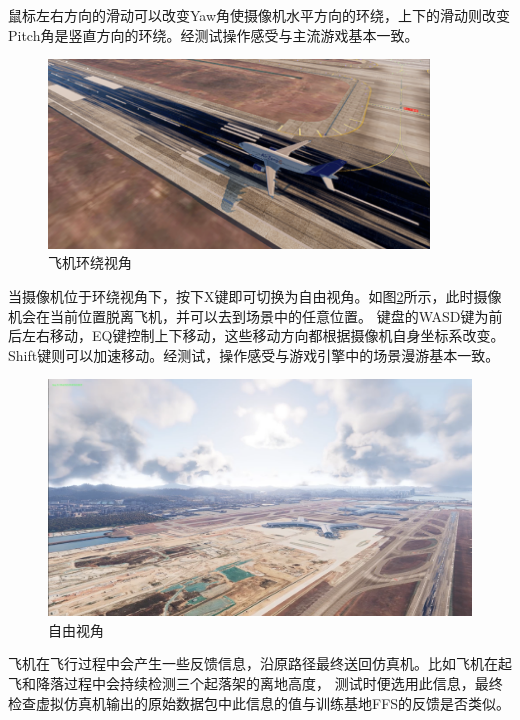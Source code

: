 鼠标左右方向的滑动可以改变Yaw角使摄像机水平方向的环绕，上下的滑动则改变Pitch角是竖直方向的环绕。经测试操作感受与主流游戏基本一致。
\clearpage
\begin{figure}[h!]
    \begin{center}
        \includegraphics[width=0.9\textwidth]{pictures/orbitcamera.png}
        \caption{飞机环绕视角}
        \label{orbittest}
    \end{center}
\end{figure}
\par
当摄像机位于环绕视角下，按下X键即可切换为自由视角。如图\ref{freetest}所示，此时摄像机会在当前位置脱离飞机，并可以去到场景中的任意位置。
键盘的WASD键为前后左右移动，EQ键控制上下移动，这些移动方向都根据摄像机自身坐标系改变。Shift键则可以加速移动。经测试，操作感受与游戏引擎中的场景漫游基本一致。
\begin{figure}[h!]
    \begin{center}
        \includegraphics[width=.85\textwidth]{pictures/freecamera.png}
        \caption{自由视角}
        \label{freetest}
    \end{center}
\end{figure}
\par
飞机在飞行过程中会产生一些反馈信息，沿原路径最终送回仿真机。比如飞机在起飞和降落过程中会持续检测三个起落架的离地高度，
测试时便选用此信息，最终检查虚拟仿真机输出的原始数据包中此信息的值与训练基地FFS的反馈是否类似。
